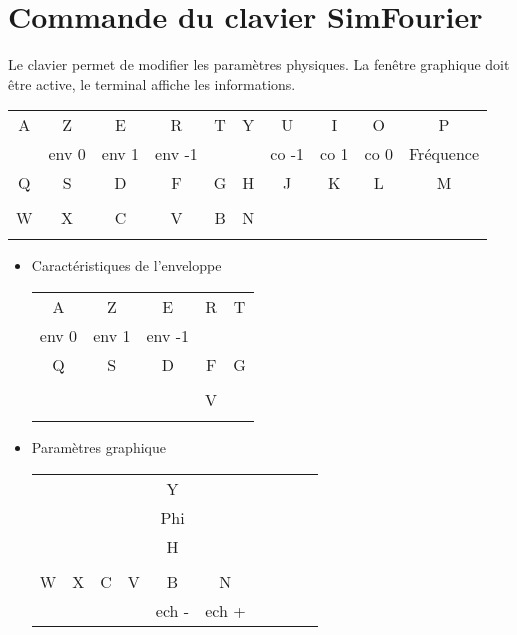 %
\chapter{Commande du clavier SimFourier}
%
Le clavier permet de modifier les paramètres physiques. La fenêtre graphique doit être active, le terminal affiche les informations.
%
\footnotesize
\begin{center}
\begin{tabular}{cccccccccc}
\sf A &\sf Z &\sf E &\sf R &\sf T &\sf Y &\sf U &\sf I &\sf O &\sf P \\
 & env 0 & env 1 & env -1 &  &  & co -1 & co 1 & co 0 & Fréquence \\
\sf Q &\sf S &\sf D &\sf F &\sf G &\sf H &\sf J &\sf K &\sf L &\sf M \\
 &  &  &  &  &  &  &  &  &  \\
\sf W &\sf X &\sf C &\sf V &\sf B &\sf N &  &  &  & \\
 &  &  &  &  &  &  &  &  & \\
\end{tabular}
\end{center}
\vspace{.3cm}
%
\normalsize
\begin{itemize}[leftmargin=2cm, label=, itemsep=0pt]%
\item Caractéristiques de l'enveloppe

\begin{tabular}{ccccc}
\sf A &\sf Z &\sf E &\sf R &\sf T  \\
env 0 & env 1 & env -1 &  &   \\
\sf Q &\sf S &\sf D &\sf F &\sf G  \\
 &  &  &  &   \\
 & & & \sf V   & \\
 & & &  &  \\
\end{tabular}
%
\end{itemize}
\begin{itemize}[leftmargin=2cm, label=, itemsep=0pt]%
\item Paramètres graphique

\hspace{3cm}
\begin{tabular}{cccccccccc}
 & & & &\sf Y \\
 & & & & Phi \\
 & & & &\sf H \\
 & & & &   & & &  & \\
\sf W &\sf X &\sf C &\sf V &\sf B &\sf N  \\
 &  &  &  & ech - & ech + \\
\end{tabular}
%
\end{itemize}
